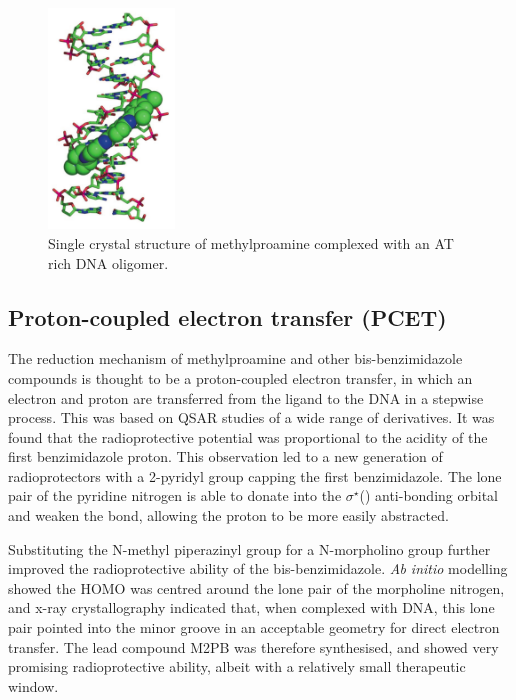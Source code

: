 \begin{refsection}
\begin{figure}
\includegraphics[width=0.3\textwidth]{Figures/mpa-dna-crystal.png}
\caption{Single crystal structure of methylproamine complexed with an AT rich DNA oligomer.}\label{fig:mpa-dna-crystal}
\end{figure}

\subsection{Proton-coupled electron transfer (PCET)}
The reduction mechanism of methylproamine and other bis-benzimidazole compounds is thought to be a proton-coupled electron transfer, in which an electron and proton are transferred from the ligand to the DNA in a stepwise process.
This was based on QSAR studies of a wide range of derivatives\autocite{Kakkar2005}.
It was found that the radioprotective potential was proportional to the acidity of the first benzimidazole proton.
This observation led to a new generation of radioprotectors with a 2-pyridyl group capping the first benzimidazole.
The lone pair of the pyridine nitrogen is able to donate into the $\sigma^{\star}$() anti-bonding orbital and weaken the bond, allowing the proton to be more easily abstracted.

Substituting the N-methyl piperazinyl group for a N-morpholino group further improved the radioprotective ability of the bis-benzimidazole.
\emph{Ab initio} modelling showed the HOMO was centred around the lone pair of the morpholine nitrogen, and x-ray crystallography indicated that, when complexed with DNA, this lone pair pointed into the minor groove in an acceptable geometry for direct electron transfer.
The lead compound M2PB  was therefore synthesised, and showed very promising radioprotective ability, albeit with a relatively small therapeutic window.


\end{refsection}
